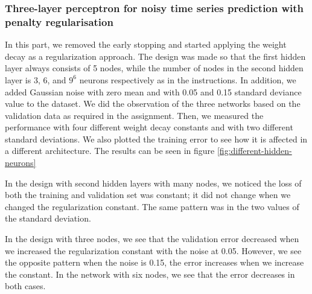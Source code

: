 \documentclass[a4paper]{article}
\begin{document}
\subsubsection{Three-layer perceptron for noisy time series prediction with penalty regularisation}
In this part, we removed the early stopping and started applying the weight decay as a regularization approach. The design was made so that the first hidden layer always consists of 5 nodes, while the number of nodes in the second hidden layer is 3, 6, and $9^6$ neurons respectively as in the instructions. In addition, we added Gaussian noise with zero mean and with 0.05 and 0.15 standard deviance value to the dataset. We did the observation of the three networks based on the validation data as required in the assignment. Then, we measured the performance with four different weight decay constants and with two different standard deviations. We also plotted the training error to see how it is affected in a different architecture. The results can be seen in figure \ref{fig:different-hidden-neurons}

In the design with second hidden layers with many nodes, we noticed the loss of both the training and validation set was constant; it did not change when we changed the regularization constant. The same pattern was in the two values of the standard deviation.

In the design with three nodes, we see that the validation error decreased when we increased the regularization constant with the noise at 0.05. However, we see the opposite pattern when the noise is 0.15, the error increases when we increase the constant. In the network with six nodes, we see that the error decreases in both cases.
\end{document}
